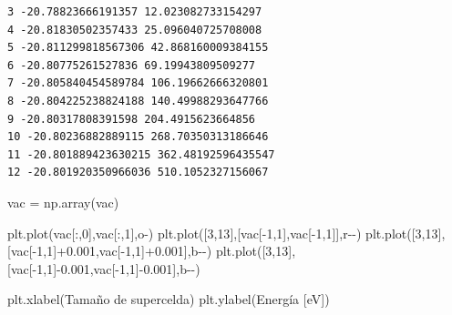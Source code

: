 \documentclass[
  letterpaper,
  DIV=11,
  numbers=noendperiod]{scrreprt}
\newenvironment{Shaded}{\begin{snugshade}}{\end{snugshade}}
\newcommand{\DecValTok}[1]{\textcolor[rgb]{0.68,0.00,0.00}{#1}}
\newcommand{\FloatTok}[1]{\textcolor[rgb]{0.68,0.00,0.00}{#1}}
\newcommand{\NormalTok}[1]{\textcolor[rgb]{0.00,0.23,0.31}{#1}}
\newcommand{\OperatorTok}[1]{\textcolor[rgb]{0.37,0.37,0.37}{#1}}
\newcommand{\StringTok}[1]{\textcolor[rgb]{0.13,0.47,0.30}{#1}}
\begin{document}
\begin{verbatim}
3 -20.78823666191357 12.023082733154297
4 -20.81830502357433 25.096040725708008
5 -20.811299818567306 42.868160009384155
6 -20.80775261527836 69.19943809509277
7 -20.805840454589784 106.19662666320801
8 -20.804225238824188 140.49988293647766
9 -20.80317808391598 204.4915623664856
10 -20.80236882889115 268.70350313186646
11 -20.801889423630215 362.48192596435547
12 -20.801920350966036 510.1052327156067
\end{verbatim}

\begin{Shaded}
\begin{Highlighting}[]
\NormalTok{vac }\OperatorTok{=}\NormalTok{ np.array(vac)}
\end{Highlighting}
\end{Shaded}

\begin{Shaded}
\begin{Highlighting}[]
\NormalTok{plt.plot(vac[:,}\DecValTok{0}\NormalTok{],vac[:,}\DecValTok{1}\NormalTok{],}\StringTok{\textquotesingle{}o{-}\textquotesingle{}}\NormalTok{)}
\NormalTok{plt.plot([}\DecValTok{3}\NormalTok{,}\DecValTok{13}\NormalTok{],[vac[}\OperatorTok{{-}}\DecValTok{1}\NormalTok{,}\DecValTok{1}\NormalTok{],vac[}\OperatorTok{{-}}\DecValTok{1}\NormalTok{,}\DecValTok{1}\NormalTok{]],}\StringTok{\textquotesingle{}r{-}{-}\textquotesingle{}}\NormalTok{)}
\NormalTok{plt.plot([}\DecValTok{3}\NormalTok{,}\DecValTok{13}\NormalTok{],[vac[}\OperatorTok{{-}}\DecValTok{1}\NormalTok{,}\DecValTok{1}\NormalTok{]}\OperatorTok{+}\FloatTok{0.001}\NormalTok{,vac[}\OperatorTok{{-}}\DecValTok{1}\NormalTok{,}\DecValTok{1}\NormalTok{]}\OperatorTok{+}\FloatTok{0.001}\NormalTok{],}\StringTok{\textquotesingle{}b{-}{-}\textquotesingle{}}\NormalTok{)}
\NormalTok{plt.plot([}\DecValTok{3}\NormalTok{,}\DecValTok{13}\NormalTok{],[vac[}\OperatorTok{{-}}\DecValTok{1}\NormalTok{,}\DecValTok{1}\NormalTok{]}\OperatorTok{{-}}\FloatTok{0.001}\NormalTok{,vac[}\OperatorTok{{-}}\DecValTok{1}\NormalTok{,}\DecValTok{1}\NormalTok{]}\OperatorTok{{-}}\FloatTok{0.001}\NormalTok{],}\StringTok{\textquotesingle{}b{-}{-}\textquotesingle{}}\NormalTok{)}

\NormalTok{plt.xlabel(}\StringTok{\textquotesingle{}Tamaño de supercelda\textquotesingle{}}\NormalTok{)}
\NormalTok{plt.ylabel(}\StringTok{\textquotesingle{}Energía [eV]\textquotesingle{}}\NormalTok{)}
\end{Highlighting}
\end{Shaded}
\end{document}
